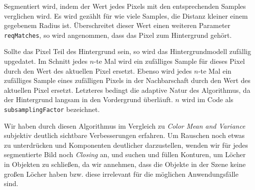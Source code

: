 \documentclass[]{scrartcl}
\begin{document}
Segmentiert wird, indem der Wert jedes Pixels mit den entsprechenden Samples verglichen wird. Es wird gez\"ahlt f\"ur wie viele Samples, die Distanz kleiner einem gegebenem Radius ist. \"Uberschreitet dieser Wert einen weiteren Parameter \texttt{reqMatches}, so wird angenommen, dass das Pixel zum Hintergrund geh\"ort.

Sollte das Pixel Teil des Hintergrund sein, so wird das Hintergrundmodell zuf\"allig upgedatet. Im Schnitt jedes $n$-te Mal wird ein zuf\"alliges Sample f\"ur dieses Pixel durch den Wert des aktuellen Pixel ersetzt. Ebenso wird jedes $n$-te Mal ein zuf\"alliges Sample eines zuf\"alligen Pixels in der Nachbarschaft durch den Wert des aktuellen Pixel ersetzt. Letzteres bedingt die adaptive Natur des Algorithmus, da der Hintergrund langsam in den Vordergrund \"uberl\"auft. $n$ wird im Code als \texttt{subsamplingFactor} bezeichnet.

Wir haben durch diesen Algorithmus im Vergleich zu \textit{Color Mean and Variance} subjektiv deutlich sichtbare Verbesserungen erfahren. Um Rauschen noch etwas zu unterdr\"ucken und Komponenten deutlicher darzustellen, wenden wir f\"ur jedes segmentierte Bild noch \textit{Closing} an, und suchen und f\"ullen Konturen, um L\"ocher in Objekten zu schließen, da wir annehmen, dass die Objekte in der Szene keine gro\ss{}en L\"ocher haben bzw. diese irrelevant f\"ur die m\"oglichen Anwendungsf\"alle sind.
\end{document}
